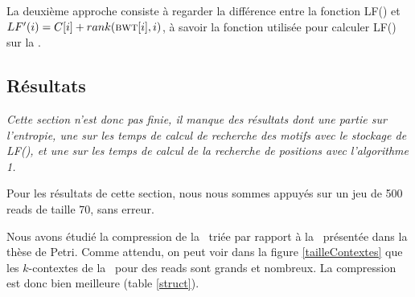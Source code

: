 La deuxième approche consiste à regarder la différence entre la fonction LF() et $LF'(i) = C[i] + rank(\textsc{bwt}[i], i)$, à savoir la fonction utilisée pour calculer LF() sur la \bwt.



%

%
%
%

\subsection{Résultats} 

\textit{Cette section n'est donc pas finie, il manque des résultats dont une partie sur l'entropie, une sur les temps de calcul de recherche des motifs avec le stockage de LF(), et une sur les temps de calcul de la recherche de positions avec l'algorithme 1.}

Pour les résultats de cette section, nous nous sommes appuyés sur un jeu de 500 reads de taille 70, sans erreur.

Nous avons étudié la compression de la \kbwt\ triée par rapport à la \kbwt\ présentée dans la thèse de Petri. Comme attendu, on peut voir dans la figure \ref{tailleContextes} que les $k$-contextes de la \kbwt\ pour des reads sont grands et nombreux. La compression est donc bien meilleure (table \ref{struct}).

